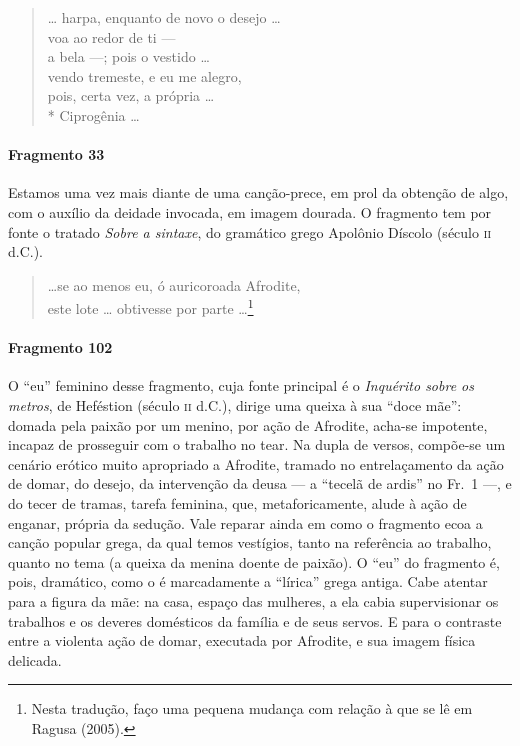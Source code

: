 \begin{verse}
\ldots{} harpa, enquanto de novo o desejo \ldots{}\\
voa ao redor de ti ---\\
a bela ---; pois o vestido \ldots{}\\
vendo tremeste, e eu me alegro,\\
pois, certa vez, a própria \ldots{} \\*
Ciprogênia \ldots{}
\end{verse}

\paragraph{Fragmento 33}

{\small Estamos uma vez mais diante de uma canção-prece, em prol da obtenção de algo,
com o auxílio da deidade invocada, em imagem dourada. O fragmento tem por fonte
o tratado \textit{Sobre a sintaxe}, do gramático grego Apolônio Díscolo (século
\textsc{ii} d.C.).}

\begin{verse}
\ldots{}se ao menos eu, ó auricoroada Afrodite,\\
este lote \ldots{} obtivesse por parte \ldots{}\footnote{ Nesta tradução, faço uma pequena mudança com relação 
à que se lê em Ragusa (2005).}
\end{verse}

\paragraph{Fragmento 102}

{\small O “eu” feminino desse fragmento, cuja fonte principal é o \textit{Inquérito
sobre os metros}, de Heféstion (século \textsc{ii} d.C.), dirige uma queixa à sua
“doce mãe”: domada pela paixão por um menino, por ação de Afrodite,
acha-se impotente, incapaz de prosseguir com o trabalho no tear. Na dupla de
versos, compõe-se um cenário erótico muito apropriado a Afrodite, tramado no
entrelaçamento da ação de domar, do desejo, da intervenção da deusa
--- a ``tecelã de ardis” no Fr.~1 ---, e do tecer de tramas, tarefa
feminina, que, metaforicamente, alude à ação de enganar, própria da sedução.
Vale reparar ainda em como o fragmento ecoa a canção popular grega, da qual
temos vestígios, tanto na referência ao trabalho, quanto no tema (a queixa da
menina doente de paixão). O “eu” do fragmento é, pois, dramático, como o é
marcadamente a “lírica” grega antiga. Cabe atentar para a figura da mãe: na
casa, espaço das mulheres, a ela cabia supervisionar os trabalhos e os deveres
domésticos da família e de seus servos. E para o contraste entre a violenta
ação de domar, executada por Afrodite, e sua imagem física delicada.}

